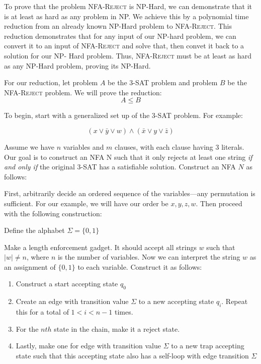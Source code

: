 \documentclass[12pt]{article}
\begin{document}
\begin{solution}

    \bbni
    
    To prove that the problem \textsc{NFA-Reject} is NP-Hard, we can demonstrate that it is at least as hard as any problem in NP. We achieve this by a polynomial time reduction from an already known NP-Hard problem to \textsc{NFA-Reject}. This reduction demonstrates that for any input of our NP-hard problem, we can convert it to an input of \textsc{NFA-Reject} and solve that, then convet it back to a solution for our NP-
    Hard problem. Thus, \textsc{NFA-Reject} must be at least as hard as any NP-Hard problem, proving its NP-Hard.
    
    For our reduction, let problem $A$ be the \textsc{3-SAT} problem and problem $B$ be the \textsc{NFA-Reject} problem. We will prove the reduction:
    \[
    A \leq B
    \]
    
    To begin, start with a generalized set up of the \textsc{3-SAT} problem. For example: 
    
    \[
    (x \vee \bar{y} \vee w) \wedge (\bar{x} \vee y \vee \bar{z})
    \]
    
    Assume we have $n$ variables and $m$ clauses, with each clause having $3$ literals. Our goal is to construct an NFA N such that it only rejects at least one string \textit{if and only if} the original \textsc{3-SAT} has a satisfiable solution. Construct an NFA $N$ as follows:
    
    First, arbitrarily decide an ordered sequence of the variables—any permutation is sufficient. For our example, we will have our order be $x, y, z, w$. Then proceed with the following construction:

    Define the alphabet $\Sigma = \{0, 1 \}$
    
    Make a length enforcement gadget. It should accept all strings $w$ such that $|w| \ne n$, where $n$ is the number of variables. Now we can interpret the string $w$ as an assignment of $\{0, 1\}$ to each variable. Construct it as follows:
    
    \begin{enumerate}
    \item Construct a start accepting state $q_0$
    \item Create an edge with transition value $\Sigma$ to a new accepting state $q_i$. Repeat this for a total of $ 1 < i < n-1$ times.
    \item For the $nth$ state in the chain, make it a reject state.
    \item Lastly, make one for edge with transition value $\Sigma$ to a new trap accepting state such that this accepting state also has a self-loop with edge transition $\Sigma$
    \end{enumerate}
    

\end{solution}
\end{document}
